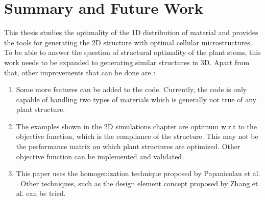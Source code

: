 \documentclass[openright,twoside]{iitkthesis}
\begin{document}
\chapter{Summary and Future Work}
This thesis studies the optimality of the 1D distribution of material and provides the tools for generating the 2D structure with optimal cellular microstructures. To be able to answer the question of structural optimality of the plant stems, this work needs to be expanded to generating similar structures in 3D. Apart from that, other improvements that can be done are :
\begin{enumerate}
\item Some more features can be added to the code. Currently, the code is only capable of handling two types of materials which is generally not true of any plant structure. 
\item The examples shown in the 2D simulations chapter are optimum w.r.t to the objective function, which is the compliance of the structure. This may not be the performance matrix on which plant structures are optimized. Other objective function can be implemented and validated.
\item This paper uses the homogenization technique proposed by Papanicolau et al. \cite{papanicolau1978asymptotic}. Other techniques, such as the design element concept proposed by Zhang et al. \cite{zhang2006scale} can be tried.

\end{enumerate}
\begin{singlespace}


\end{singlespace}
\end{document}
